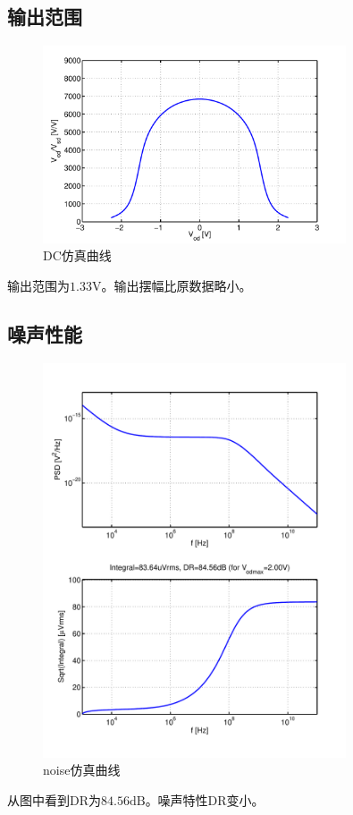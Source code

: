 \documentclass[a4paper]{article}
\newcommand{\uV}{\si{\volt}}
\newcommand{\udB}{\si{\deci\bel}}
\begin{document}
\subsection{输出范围}
\begin{figure}[htb]
    \begin{center}
        \includegraphics[width=0.8\textwidth]{slow/dc.pdf}
    \end{center}
    \caption{DC仿真曲线}
    \label{slowdc}
\end{figure}
输出范围为$1.33\uV$。输出摆幅比原数据略小。
\newpage
\clearpage
\subsection{噪声性能}
\begin{figure}[htb]
    \begin{center}
        \includegraphics[width=0.8\textwidth]{slow/noise.pdf}
    \end{center}
    \caption{noise仿真曲线}
    \label{slownoise}
\end{figure}
从图中看到DR为$84.56\udB$。噪声特性DR变小。
\newpage
\clearpage
\end{document}
